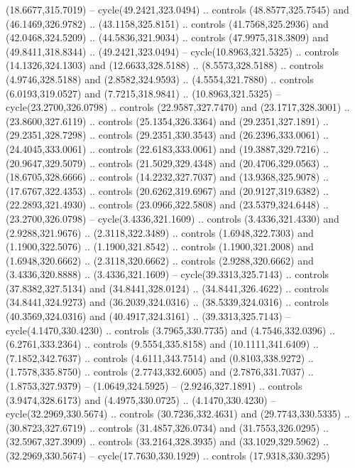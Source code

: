 \begin{scope}[cm={{1.25,0.0,0.0,-1.25,(0.0,743.43331)}}]
    (18.6677,315.7019) -- cycle(49.2421,323.0494) .. controls (48.8577,325.7545)
    and (46.1469,326.9782) .. (43.1158,325.8151) .. controls (41.7568,325.2936)
    and (42.0468,324.5209) .. (44.5836,321.9034) .. controls (47.9975,318.3809)
    and (49.8411,318.8344) .. (49.2421,323.0494) -- cycle(10.8963,321.5325) ..
    controls (14.1326,324.1303) and (12.6633,328.5188) .. (8.5573,328.5188) ..
    controls (4.9746,328.5188) and (2.8582,324.9593) .. (4.5554,321.7880) ..
    controls (6.0193,319.0527) and (7.7215,318.9841) .. (10.8963,321.5325) --
    cycle(23.2700,326.0798) .. controls (22.9587,327.7470) and (23.1717,328.3001)
    .. (23.8600,327.6119) .. controls (25.1354,326.3364) and (29.2351,327.1891) ..
    (29.2351,328.7298) .. controls (29.2351,330.3543) and (26.2396,333.0061) ..
    (24.4045,333.0061) .. controls (22.6183,333.0061) and (19.3887,329.7216) ..
    (20.9647,329.5079) .. controls (21.5029,329.4348) and (20.4706,329.0563) ..
    (18.6705,328.6666) .. controls (14.2232,327.7037) and (13.9368,325.9078) ..
    (17.6767,322.4353) .. controls (20.6262,319.6967) and (20.9127,319.6382) ..
    (22.2893,321.4930) .. controls (23.0966,322.5808) and (23.5379,324.6448) ..
    (23.2700,326.0798) -- cycle(3.4336,321.1609) .. controls (3.4336,321.4330) and
    (2.9288,321.9676) .. (2.3118,322.3489) .. controls (1.6948,322.7303) and
    (1.1900,322.5076) .. (1.1900,321.8542) .. controls (1.1900,321.2008) and
    (1.6948,320.6662) .. (2.3118,320.6662) .. controls (2.9288,320.6662) and
    (3.4336,320.8888) .. (3.4336,321.1609) -- cycle(39.3313,325.7143) .. controls
    (37.8382,327.5134) and (34.8441,328.0124) .. (34.8441,326.4622) .. controls
    (34.8441,324.9273) and (36.2039,324.0316) .. (38.5339,324.0316) .. controls
    (40.3569,324.0316) and (40.4917,324.3161) .. (39.3313,325.7143) --
    cycle(4.1470,330.4230) .. controls (3.7965,330.7735) and (4.7546,332.0396) ..
    (6.2761,333.2364) .. controls (9.5554,335.8158) and (10.1111,341.6409) ..
    (7.1852,342.7637) .. controls (4.6111,343.7514) and (0.8103,338.9272) ..
    (1.7578,335.8750) .. controls (2.7743,332.6005) and (2.7876,331.7037) ..
    (1.8753,327.9379) -- (1.0649,324.5925) -- (2.9246,327.1891) .. controls
    (3.9474,328.6173) and (4.4975,330.0725) .. (4.1470,330.4230) --
    cycle(32.2969,330.5674) .. controls (30.7236,332.4631) and (29.7743,330.5335)
    .. (30.8723,327.6719) .. controls (31.4857,326.0734) and (31.7553,326.0295) ..
    (32.5967,327.3909) .. controls (33.2164,328.3935) and (33.1029,329.5962) ..
    (32.2969,330.5674) -- cycle(17.7630,330.1929) .. controls (17.9318,330.3295)

\end{scope}

